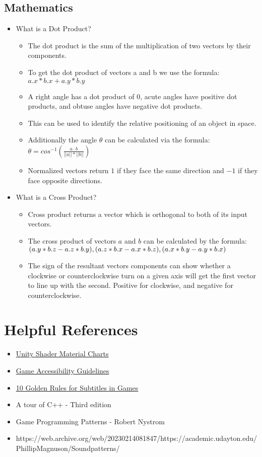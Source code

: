 \documentclass{article}
\begin{document}
\subsection{Mathematics}
\begin{itemize}
    \item What is a Dot Product?
    \begin{itemize}
        \item The dot product is the sum of the multiplication of two vectors by their components.
        \item To get the dot product of vectors a and b we use the formula: $a.x*b.x + a.y*b.y$
        \item A right angle has a dot product of $0$, acute angles have positive dot products, and obtuse angles have negative dot products.
        \item This can be used to identify the relative positioning of an object in space.
        \item Additionally the angle $\theta$ can be calculated via the formula: $\theta = cos^{-1}(\frac{a \cdot b}{||a||*||b||})$
        \item Normalized vectors return $1$ if they face the same direction and $-1$ if they face opposite directions.
    \end{itemize}
    \item What is a Cross Product?
    \begin{itemize}
        \item Cross product returns a vector which is orthogonal to both of its input vectors.
        \item The cross product of vectors $a$ and $b$ can be calculated by the formula:
        $\newline (a.y*b.z - a.z*b.y), (a.z*b.x - a.x*b.z), (a.x*b.y - a.y*b.x)$
        \item The sign of the resultant vectors components can show whether a clockwise or counterclockwise turn on a given axis will get the first vector to line up with the second. Positive for clockwise, and negative for counterclockwise.
    \end{itemize}
\end{itemize}

\newpage
\section{Helpful References}
\begin{itemize}
    \item \href{https://docs.unity3d.com/Manual/StandardShaderMaterialCharts.html}{Unity Shader Material Charts}
    \item
    \href{https://gameaccessibilityguidelines.com/full-list/}{Game Accessibility Guidelines}
    \item
    \href{https://80.lv/articles/10-golden-rules-on-subtitles-for-games/}{10 Golden Rules for Subtitles in Games}
    \item A tour of C++ - Third edition
    \item Game Programming Patterns - Robert Nystrom
    \item https://web.archive.org/web/20230214081847/https://academic.udayton.edu/PhillipMagnuson/Soundpatterns/
\end{itemize}
\end{document}
